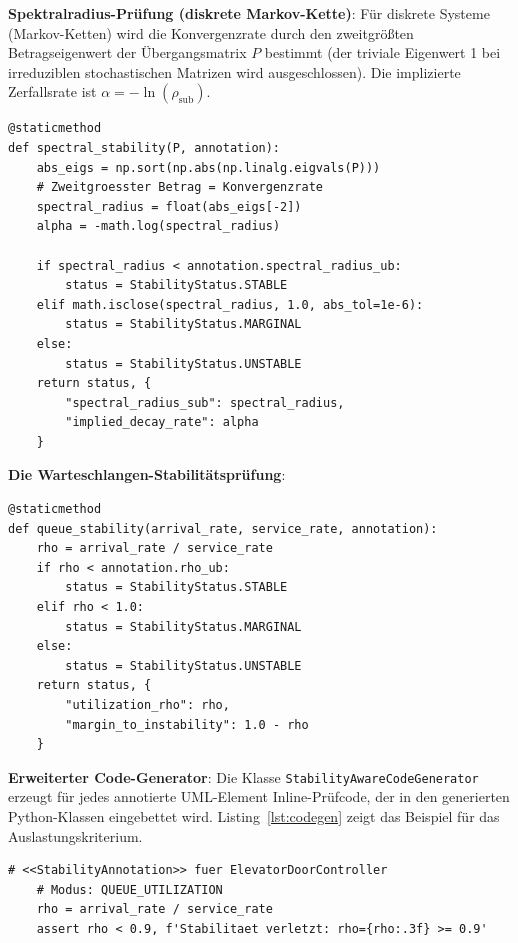 ﻿\documentclass[a4paper,12pt]{scrreprt}
\theoremstyle{definition}
\begin{document}
\textbf{Spektralradius-Prüfung (diskrete Markov-Kette)}:
Für diskrete Systeme (Markov-Ketten) wird die Konvergenzrate durch den
zweitgrößten Betragseigenwert der Übergangsmatrix $P$ bestimmt
(der triviale Eigenwert 1 bei irreduziblen stochastischen Matrizen wird
ausgeschlossen). Die implizierte Zerfallsrate ist
$\alpha = -\ln(\rho_{\text{sub}})$.

\begin{lstlisting}[style=python,
	caption={Spektralradius-Stabilitätsprüfung für Markov-Ketten},
	label={lst:spectral}]
@staticmethod
def spectral_stability(P, annotation):
	abs_eigs = np.sort(np.abs(np.linalg.eigvals(P)))
	# Zweitgroesster Betrag = Konvergenzrate
	spectral_radius = float(abs_eigs[-2])
	alpha = -math.log(spectral_radius)
	
	if spectral_radius < annotation.spectral_radius_ub:
		status = StabilityStatus.STABLE
	elif math.isclose(spectral_radius, 1.0, abs_tol=1e-6):
		status = StabilityStatus.MARGINAL
	else:
		status = StabilityStatus.UNSTABLE
	return status, {
		"spectral_radius_sub": spectral_radius,
		"implied_decay_rate": alpha
	}
\end{lstlisting}

\textbf{Die Warteschlangen-Stabilitätsprüfung}:
\begin{lstlisting}[style=python,
	caption={Auslastungsprüfung für M/M/1-Warteschlangen},
	label={lst:queue}]
@staticmethod
def queue_stability(arrival_rate, service_rate, annotation):
	rho = arrival_rate / service_rate
	if rho < annotation.rho_ub:
		status = StabilityStatus.STABLE
	elif rho < 1.0:
		status = StabilityStatus.MARGINAL
	else:
		status = StabilityStatus.UNSTABLE
	return status, {
		"utilization_rho": rho,
		"margin_to_instability": 1.0 - rho
	}
\end{lstlisting}

\textbf{Erweiterter Code-Generator}:
Die Klasse \texttt{StabilityAwareCodeGenerator} erzeugt für jedes annotierte
UML-Element Inline-Prüfcode, der in den generierten Python-Klassen
eingebettet wird. Listing~\ref{lst:codegen} zeigt das Beispiel für das
Auslastungskriterium.

\begin{lstlisting}[style=python,
	caption={Generierter Stabilitäts-Check-Code (Auslastungsmodus)},
	label={lst:codegen}]
	# <<StabilityAnnotation>> fuer ElevatorDoorController
	# Modus: QUEUE_UTILIZATION
	rho = arrival_rate / service_rate
	assert rho < 0.9, f'Stabilitaet verletzt: rho={rho:.3f} >= 0.9'
\end{lstlisting}
\end{document}
